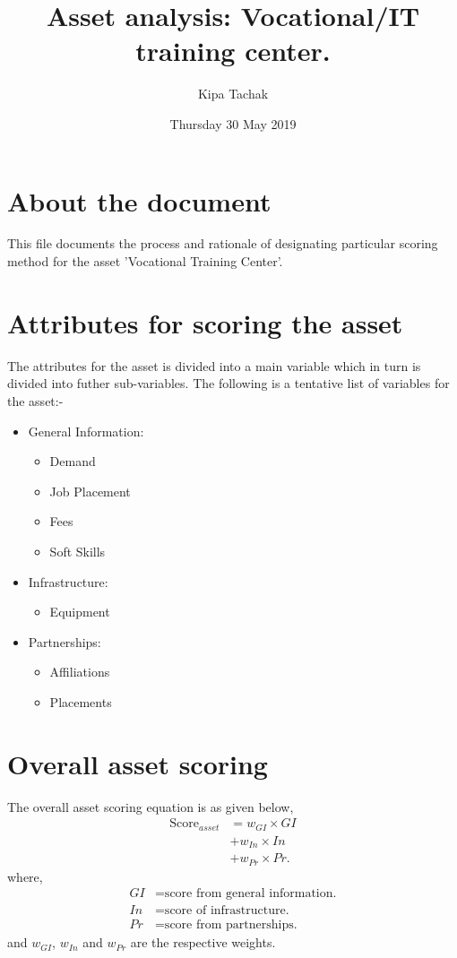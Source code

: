 \documentclass[oneside,twocolumn]{article}
\title{Asset analysis: Vocational/IT training center.}
\author{Kipa Tachak}
\date{Thursday 30 May 2019}
\begin{document}
\maketitle

\section{About the document}
This file documents the process and rationale of designating
particular scoring method for the asset 'Vocational Training
Center'.


\section{Attributes for scoring the asset}
The attributes for the asset is divided into a main variable
which in turn is divided into futher sub-variables. The following
is a tentative list of variables for the asset:-
\begin{itemize}
\item General Information:
  \begin{itemize}
  \item Demand
  \item Job Placement
  \item Fees
  \item Soft Skills
  \end{itemize}
\item Infrastructure:
  \begin{itemize}
  \item Equipment
  \end{itemize}
\item Partnerships:
  \begin{itemize}
  \item Affiliations
  \item Placements
  \end{itemize}
\end{itemize}

\section{Overall asset scoring}
The overall asset scoring equation is as given below,
\begin{align*}
	\text{Score}_{asset} &= w_{GI} \times GI \\
			     &+ w_{In} \times In \\
			     &+ w_{Pr} \times Pr.
\end{align*}
where,
\begin{align*}
	GI &= \text{score from general information.} \\
	In &= \text{score of infrastructure.} \\
	Pr &= \text{score from partnerships.}
\end{align*}
and \(w_{GI}\), \(w_{In}\) and \(w_{Pr}\) are the respective weights.
\end{document}
